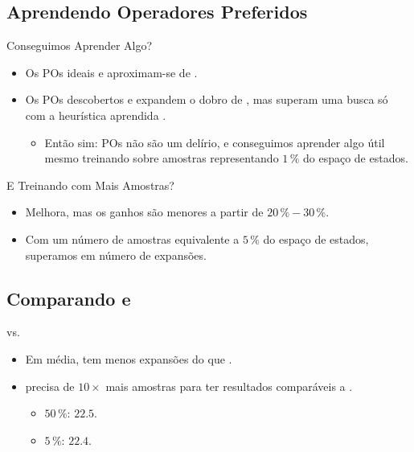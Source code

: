 \documentclass{beamer}
\begin{document}
\subsection{Aprendendo Operadores Preferidos}
\begin{frame}{Conseguimos Aprender Algo?}

\begin{itemize}
\item Os POs ideais \postartable e \postar aproximam-se de \hstar.
\pause
\item Os POs descobertos \pogstar e \pog expandem o dobro de \hstar, mas superam uma busca só com a heurística aprendida \hnn.
\pause
  \begin{itemize}
    \item Então sim: POs não são um delírio, e \alert{conseguimos aprender algo útil} mesmo treinando sobre amostras representando \alert{$1\,\%$ do espaço de estados}.
  \end{itemize}
\end{itemize}
\end{frame}

\begin{frame}{E Treinando com Mais Amostras?}

\begin{itemize}
  \item Melhora, mas os ganhos são menores a partir de $20\,\% - 30\,\%$.
  \pause
  \item Com um número de amostras equivalente a \alert{$5\,\%$} do espaço de estados, \alert{superamos \poff} em número de expansões.
\end{itemize}
\end{frame}

\subsection{Comparando \bfsrs e \bfsrw}
\begin{frame}{\bfsrs vs. \bfsrw}

\begin{itemize}
  \item Em média, \pog \alert{tem menos expansões do que} \pofsm.
  \pause
  \item \pofsm \alert{precisa de $10\times$ mais amostras} para ter resultados comparáveis a \pog.
    \begin{itemize}
      \item \pofsm $50\,\%$: $22.5$.
      \item \pog $5\,\%$: $22.4$.
    \end{itemize}
\end{itemize}
\end{frame}
\end{document}

